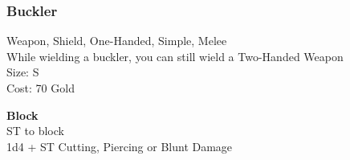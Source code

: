 \subsubsection{Buckler}\label{weapon:buckler}
Weapon, Shield, One-Handed, Simple, Melee\\
While wielding a buckler, you can still wield a Two-Handed Weapon\\
Size: S\\
Cost: 70 Gold

\textbf{Block}\\
ST to block\\
1d4 + \texttimes ST Cutting, Piercing or Blunt Damage

